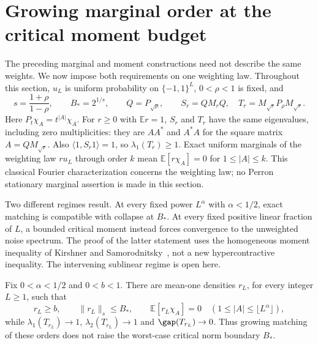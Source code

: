 \section{Growing marginal order at the critical moment budget}
\label{sec:growing-marginals}

The preceding marginal and moment constructions need not describe the same
weights. We now impose both requirements on one weighting law. Throughout
this section, $u_L$ is uniform probability on $\{-1,1\}^L$,
$0<\rho<1$ is fixed, and
\[
 s=\frac{1+\rho}{1-\rho},\qquad B_*=2^{1/s},\qquad
 Q=P_{\sqrt\rho},\qquad
 S_r=QM_rQ,\quad T_r=M_{\sqrt r}P_\rho M_{\sqrt r}.
\]
Here $P_t\chi_A=t^{|A|}\chi_A$. For $r\geq0$ with $\mathbb E r=1$,
$S_r$ and $T_r$ have the same eigenvalues, including zero multiplicities:
they are $AA^*$ and $A^*A$ for the square matrix $A=QM_{\sqrt r}$.
Also $\langle1,S_r1\rangle=1$, so $\lambda_1(T_r)\geq1$.
Exact uniform marginals of the weighting law $r u_L$ through order $k$
mean $\mathbb E[r\chi_A]=0$ for $1\leq|A|\leq k$.
This classical Fourier characterization concerns the weighting law;
no Perron stationary marginal assertion is made in this section.

Two different regimes result. At every fixed power $L^\alpha$ with
$\alpha<1/2$, exact matching is compatible with collapse at $B_*$.
At every fixed positive linear fraction of $L$, a bounded critical moment
instead forces convergence to the unweighted noise spectrum. The proof of
the latter statement uses the homogeneous moment inequality of
Kirshner and Samorodnitsky~\cite{kirshner-samorodnitsky}, not a new
hypercontractive inequality. The intervening sublinear regime is open here.

\begin{theorem}
\label{thm:growing-collapse}
Fix $0<\alpha<1/2$ and $0<b<1$. There are mean-one densities $r_L$,
for every integer $L\geq1$, such that
\[
 r_L\geq b,\qquad \|r_L\|_s\leq B_*,\qquad
 \mathbb E[r_L\chi_A]=0\quad(1\leq |A|\leq\lfloor L^\alpha\rfloor),
\]
while $\lambda_1(T_{r_L})\to1$, $\lambda_2(T_{r_L})\to1$ and
$\gap(T_{r_L})\to0$. Thus growing matching of these orders does not
raise the worst-case critical norm boundary $B_*$.
\end{theorem}

